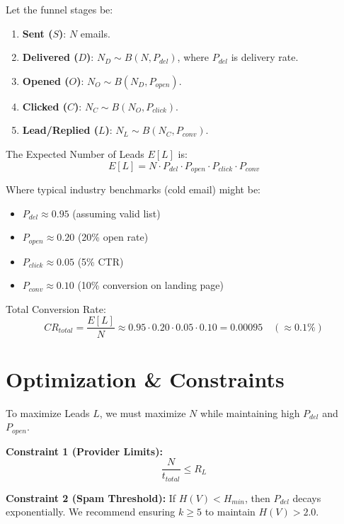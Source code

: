\documentclass{article}
\begin{document}
Let the funnel stages be:
\begin{enumerate}
    \item \textbf{Sent ($S$)}: $N$ emails.
    \item \textbf{Delivered ($D$)}: $N_D \sim B(N, P_{del})$, where $P_{del}$ is delivery rate.
    \item \textbf{Opened ($O$)}: $N_O \sim B(N_D, P_{open})$.
    \item \textbf{Clicked ($C$)}: $N_C \sim B(N_O, P_{click})$.
    \item \textbf{Lead/Replied ($L$)}: $N_L \sim B(N_C, P_{conv})$.
\end{enumerate}

The Expected Number of Leads $E[L]$ is:
\begin{equation}
    E[L] = N \cdot P_{del} \cdot P_{open} \cdot P_{click} \cdot P_{conv}
\end{equation}

Where typical industry benchmarks (cold email) might be:
\begin{itemize}
    \item $P_{del} \approx 0.95$ (assuming valid list)
    \item $P_{open} \approx 0.20$ (20\% open rate)
    \item $P_{click} \approx 0.05$ (5\% CTR)
    \item $P_{conv} \approx 0.10$ (10\% conversion on landing page)
\end{itemize}

Total Conversion Rate:
\begin{equation}
    CR_{total} = \frac{E[L]}{N} \approx 0.95 \cdot 0.20 \cdot 0.05 \cdot 0.10 = 0.00095 \quad (\approx 0.1\%)
\end{equation}

\section{Optimization \& Constraints}
To maximize Leads $L$, we must maximize $N$ while maintaining high $P_{del}$ and $P_{open}$.

\textbf{Constraint 1 (Provider Limits):}
\begin{equation}
    \frac{N}{t_{total}} \le R_{L}
\end{equation}

\textbf{Constraint 2 (Spam Threshold):}
If $H(V) < H_{min}$, then $P_{del}$ decays exponentially.
We recommend ensuring $k \ge 5$ to maintain $H(V) > 2.0$.
\end{document}
